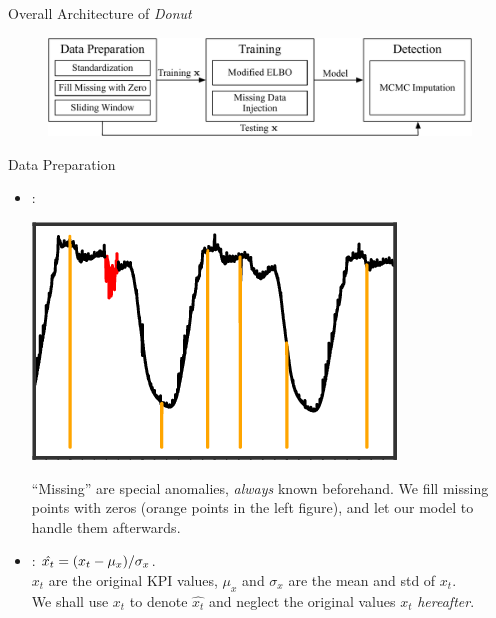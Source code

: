 \documentclass[usenames,dvipsnames]{beamer}
\newcommand{\DONUT}{\textit{Donut}}
\let\originalleft\left
\let\originalright\right
\newcommand{\mleft}{\mathopen{}\mathclose\bgroup\originalleft}
\newcommand{\mright}{\aftergroup\egroup\originalright}
\begin{document}
\begin{frame}{Overall Architecture of \DONUT{}}
  \begin{figure}
    \centering
    \includegraphics[width=\columnwidth]{architecture}
  \end{figure}
\end{frame}

\begin{frame}{Data Preparation}
  \begin{itemize}\setlength\itemsep{.2em}
    \item {}:\\\vspace{.3em}
      \begin{minipage}{0.17\textwidth}
        \includegraphics[height=.15\textheight]{fill-missing}  
      \end{minipage}\hfill
      \begin{minipage}{0.73\textwidth}
        \small
        ``Missing'' are special anomalies, \textit{always} known beforehand.
        We fill missing points with zeros (orange points in the left figure), and let our model to handle them afterwards.
      \end{minipage}\vspace{.3em}
    \item {}: $\hat{x_t} = \mleft(x_t - \mu_x\mright)/\sigma_x$.\\\vspace{.2em}
      {\small $x_t$ are the original KPI values, $\mu_x$ and $\sigma_x$ are the mean and std of $x_t$. \\\vspace{-.2em} We shall use $x_t$ to denote $\hat{x_t}$ and neglect the original values $x_t$ \textit{hereafter}.}

\end{itemize}
\end{frame}
\end{document}
